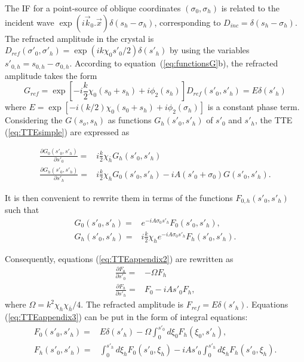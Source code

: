 \documentclass[preprint]{iucr}              %
\begin{document}
The IF for a point-source of oblique coordinates $(\sigma_0,\sigma_h)$ is related to the incident wave $\exp(i\vec k_0 . \vec x) \delta(s_h-\sigma_h)$, corresponding to $D_{inc}=\delta(s_h-\sigma_h)$. The refracted amplitude in the crystal is $D_{ref}(\sigma'_0,\sigma'_h)=\exp(i k \chi_0 s'_0/2)\delta(s'_h)$ by using the variables $s'_{0,h}=s_{0,h}-\sigma_{0,h}$.
According to equation~(\ref{eq:functionsG}b), the refracted amplitude takes the form
\begin{equation}
    G_{ref}=\exp[-i\frac{k}{2}\chi_0(s_0+s_h)+i \phi_2(s_h)] D_{ref}(s'_0,s'_h) = E\delta(s'_h)
\end{equation}
where $E=\exp[-i (k/2) \chi_0 (s_0 + s_h) + i \phi_2(\sigma_h)]$ is a constant phase term. Considering the $G(s_o,s_h)$  as functions $G_h(s'_0,s'_h)$ of $s'_0$ and $s'_h$, the TTE (\ref{eq:TTEsimple}) are expressed as

\begin{subequations}
\label{eq:TTEappendix}
\begin{align}
    \frac{\partial G_0(s'_0,s'_h)}{\partial s'_0}=&i\frac{k}{2}\chi_{\bar h} G_h(s'_0,s'_h) \\
    \frac{\partial G_h(s'_0,s'_h)}{\partial s'_h}=&i\frac{k}{2}\chi_{h} G_0(s'_0,s'_h) -i A (s'_0+\sigma_0)G(s'_0,s'_h).
\end{align}
\end{subequations}

It is then convenient to rewrite them in terms of the functions $F_{0,h}(s'_0,s'_h)$ such that
\begin{subequations}
\label{eq:TTEappendix2}
\begin{align}
    G_0(s'_0,s'_h) =& e^{-iA\sigma_0s'_h} F_0(s'_0,s'_h),\\
    G_h(s'_0,s'_h)=&i\frac{k}{2}\chi_{h} e^{-iA\sigma_0s'_h} F_h(s'_0,s'_h).
\end{align}
\end{subequations}

Consequently, equations (\ref{eq:TTEappendix2}) are rewritten as
\begin{subequations}
\label{eq:TTEappendix3}
\begin{align}
    \frac{\partial F_0}{\partial s'_0}=&-\Omega F_h \\
    \frac{\partial F_h}{\partial s'_h}=&F_0-i A s'_0 F_h,
\end{align}
\end{subequations}
where $\Omega=k^2\chi_h\chi_{\bar h}/4$. The refracted amplitude is $F_{ref}=E\delta(s'_h)$. Equations (\ref{eq:TTEappendix3}) can be put in the form of integral equations:
\begin{subequations}
\label{eq:TTEappendixIntegral}
\begin{align}
    F_0(s'_0,s'_h) =& E \delta(s'_h) -\Omega\int_0^{s'_0} d\xi_0F_h(\xi_0,s'_h),\\
    F_h(s'_0,s'_h)=& \int_0^{s'_h} d\xi_h F_0(s'_0,\xi_h) - i A s'_0 \int_0^{s'_h} d\xi_h F_h(s'_0,\xi_h).
\end{align}
\end{subequations}
\end{document}

